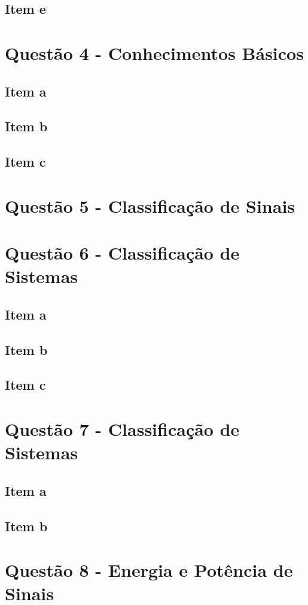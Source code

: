 \documentclass[a4paper, 12pt]{article}
\begin{document}
        \subsection{Item e}
    \section{Quest\~{a}o 4 - Conhecimentos Básicos}
        \subsection{Item a}
        \subsection{Item b}
        \subsection{Item c}
    \section{Quest\~{a}o 5 - Classificação de Sinais}
    \section{Quest\~{a}o 6 - Classificação de Sistemas}
        \subsection{Item a}
        \subsection{Item b}
        \subsection{Item c}
    \section{Quest\~{a}o 7 - Classificação de Sistemas}
        \subsection{Item a}
        \subsection{Item b}
    \section{Quest\~{a}o 8 - Energia e Potência de Sinais}
\end{document}
